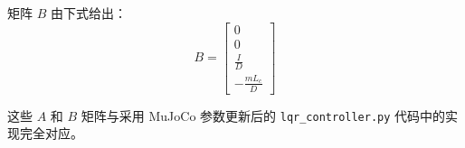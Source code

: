 \documentclass[a4paper,12pt]{article}
\begin{document}
矩阵 $B$ 由下式给出：
\begin{equation}
    B = \begin{bmatrix} 
    0 \\
    0 \\
    \frac{I}{D} \\
    -\frac{m L_c}{D} 
    \end{bmatrix}
\end{equation}

这些 $A$ 和 $B$ 矩阵与采用 MuJoCo 参数更新后的 \texttt{lqr\_controller.py} 代码中的实现完全对应。
\end{document}
